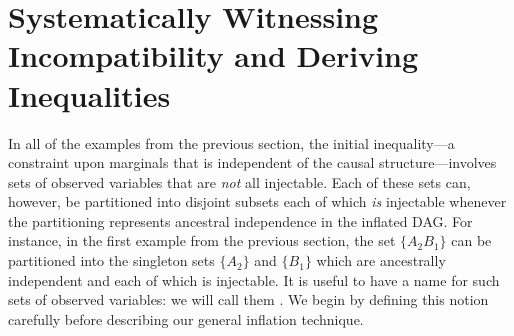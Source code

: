 

\section{Systematically Witnessing Incompatibility and Deriving Inequalities}
\label{sec:ineqs}


In all of the examples from the previous section, the initial inequality---a constraint upon marginals that is independent of the causal structure---involves sets of observed variables that are \emph{not} all injectable.  Each of these sets can, however, be partitioned into disjoint subsets each of which {\em is} injectable whenever the partitioning represents ancestral independence in the inflated DAG.   For instance, in the first example from the previous section, the set $\{ A_2 B_1\}$ can be partitioned into the singleton sets $\{ A_2 \}$ and $\{ B_1\}$ which are ancestrally independent and each of which is injectable.  It is useful to have a name for such sets of observed variables: we will call them .  We begin by defining this notion carefully before describing our general inflation technique. 

